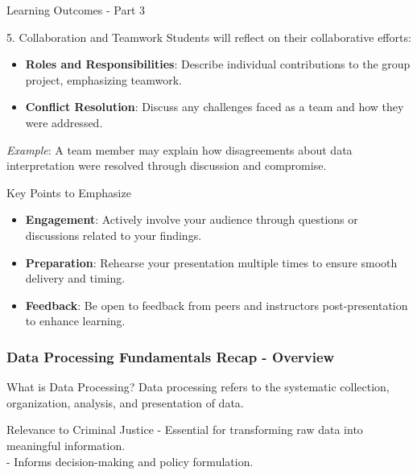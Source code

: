 \documentclass[aspectratio=169]{beamer}
\begin{document}
\begin{frame}[fragile]{Learning Outcomes - Part 3}
    \begin{block}{5. Collaboration and Teamwork}
        Students will reflect on their collaborative efforts:
        \begin{itemize}
            \item \textbf{Roles and Responsibilities}: Describe individual contributions to the group project, emphasizing teamwork.
            \item \textbf{Conflict Resolution}: Discuss any challenges faced as a team and how they were addressed.
        \end{itemize}
        \textit{Example}: A team member may explain how disagreements about data interpretation were resolved through discussion and compromise.
    \end{block}

    \begin{block}{Key Points to Emphasize}
        \begin{itemize}
            \item \textbf{Engagement}: Actively involve your audience through questions or discussions related to your findings.
            \item \textbf{Preparation}: Rehearse your presentation multiple times to ensure smooth delivery and timing.
            \item \textbf{Feedback}: Be open to feedback from peers and instructors post-presentation to enhance learning.
        \end{itemize}
    \end{block}
\end{frame}

\begin{frame}[fragile]
    \frametitle{Data Processing Fundamentals Recap - Overview}
    \begin{block}{What is Data Processing?}
        Data processing refers to the systematic collection, organization, analysis, and presentation of data.
    \end{block}
    \begin{block}{Relevance to Criminal Justice}
        - Essential for transforming raw data into meaningful information.\\
        - Informs decision-making and policy formulation.
    \end{block}
\end{frame}
\end{document}
